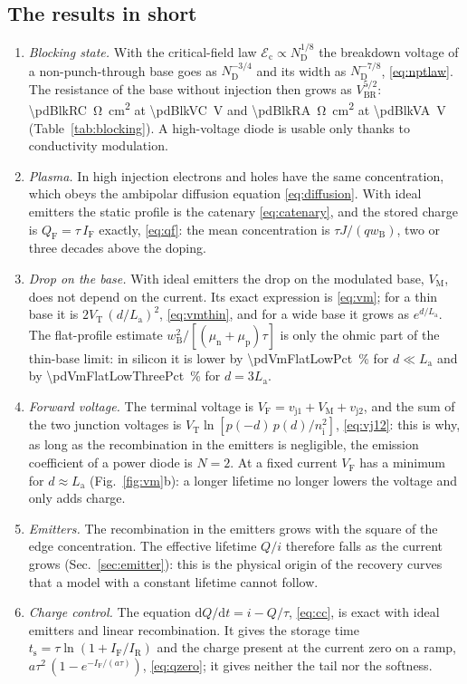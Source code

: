 \documentclass[10pt,a4paper]{scrartcl}
\newcommand{\IF}{I_\mathrm{F}}
\newcommand{\IR}{I_\mathrm{R}}
\newcommand{\VF}{V_\mathrm{F}}
\newcommand{\ts}{t_\mathrm{s}}
\newcommand{\vjo}{v_\mathrm{j1}}
\newcommand{\vjt}{v_\mathrm{j2}}
\newcommand{\VT}{V_\mathrm{T}}
\newcommand{\diff}{\mathrm{d}}
\newcommand{\Nem}{N}                          %
\newcommand{\Ec}{\mathcal{E}_\mathrm{c}}      %
\newcommand{\ND}{N_\mathrm{D}}
\newcommand{\nint}{n_\mathrm{i}}
\newcommand{\wB}{w_\mathrm{B}}
\newcommand{\La}{L_\mathrm{a}}
\newcommand{\mun}{\mu_\mathrm{n}}
\newcommand{\mup}{\mu_\mathrm{p}}
\newcommand{\VM}{V_\mathrm{M}}
\newcommand{\Vbr}{V_\mathrm{BR}}
\newcommand{\QF}{Q_\mathrm{F}}
\begin{document}
\subsection*{The results in short}
\begin{enumerate}
\item \emph{Blocking state.} With the critical-field law $\Ec \propto \ND^{1/8}$ the breakdown voltage of a non-punch-through base goes as $\ND^{-3/4}$ and its width as $\ND^{-7/8}$, \eqref{eq:nptlaw}. The resistance of the base without injection then grows as $\Vbr^{5/2}$: \SI{\pdBlkRC}{\ohm\centi\metre\squared} at \SI{\pdBlkVC}{\volt} and \SI{\pdBlkRA}{\ohm\centi\metre\squared} at \SI{\pdBlkVA}{\volt} (Table~\ref{tab:blocking}). A high-voltage diode is usable only thanks to conductivity modulation.
\item \emph{Plasma.} In high injection electrons and holes have the same concentration, which obeys the ambipolar diffusion equation \eqref{eq:diffusion}. With ideal emitters the static profile is the catenary \eqref{eq:catenary}, and the stored charge is $\QF = \tau\,\IF$ exactly, \eqref{eq:qf}: the mean concentration is $\tau J/(q\wB)$, two or three decades above the doping.
\item \emph{Drop on the base.} With ideal emitters the drop on the modulated base, $\VM$, does not depend on the current. Its exact expression is \eqref{eq:vm}; for a thin base it is $2\VT\,(d/\La)^2$, \eqref{eq:vmthin}, and for a wide base it grows as $e^{d/\La}$. The flat-profile estimate $\wB^2/[(\mun+\mup)\tau]$ is only the ohmic part of the thin-base limit: in silicon it is lower by \SI{\pdVmFlatLowPct}{\percent} for $d \ll \La$ and by \SI{\pdVmFlatLowThreePct}{\percent} for $d = 3\La$.
\item \emph{Forward voltage.} The terminal voltage is $\VF = \vjo + \VM + \vjt$, and the sum of the two junction voltages is $\VT\ln[p(-d)\,p(d)/\nint^2]$, \eqref{eq:vj12}: this is why, as long as the recombination in the emitters is negligible, the emission coefficient of a power diode is $\Nem = 2$. At a fixed current $\VF$ has a minimum for $d \approx \La$ (Fig.~\ref{fig:vm}b): a longer lifetime no longer lowers the voltage and only adds charge.
\item \emph{Emitters.} The recombination in the emitters grows with the square of the edge concentration. The effective lifetime $Q/i$ therefore falls as the current grows (Sec.~\ref{sec:emitter}): this is the physical origin of the recovery curves that a model with a constant lifetime cannot follow.
\item \emph{Charge control.} The equation $\diff Q/\diff t = i - Q/\tau$, \eqref{eq:cc}, is exact with ideal emitters and linear recombination. It gives the storage time $\ts = \tau\ln(1+\IF/\IR)$ and the charge present at the current zero on a ramp, $a\tau^2\,(1-e^{-\IF/(a\tau)})$, \eqref{eq:qzero}; it gives neither the tail nor the softness.

\end{enumerate}
\end{document}
